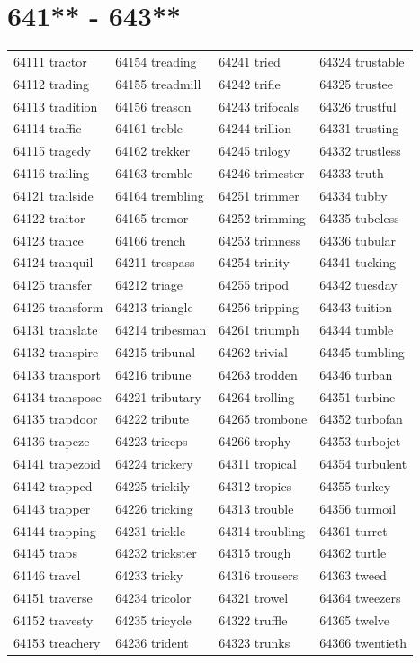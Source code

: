 \documentclass[10pt, oneside]{book}
\begin{document}
\begin{table}
	\centering
	\section*{641** - 643**}
	\begin{tabular}{l l l l}
64111 tractor &64154 treading &64241 tried &64324 trustable\\
64112 trading &64155 treadmill &64242 trifle &64325 trustee\\
64113 tradition &64156 treason &64243 trifocals &64326 trustful\\
64114 traffic &64161 treble &64244 trillion &64331 trusting\\
64115 tragedy &64162 trekker &64245 trilogy &64332 trustless\\
64116 trailing &64163 tremble &64246 trimester &64333 truth\\
64121 trailside &64164 trembling &64251 trimmer &64334 tubby\\
64122 traitor &64165 tremor &64252 trimming &64335 tubeless\\
64123 trance &64166 trench &64253 trimness &64336 tubular\\
64124 tranquil &64211 trespass &64254 trinity &64341 tucking\\
64125 transfer &64212 triage &64255 tripod &64342 tuesday\\
64126 transform &64213 triangle &64256 tripping &64343 tuition\\
64131 translate &64214 tribesman &64261 triumph &64344 tumble\\
64132 transpire &64215 tribunal &64262 trivial &64345 tumbling\\
64133 transport &64216 tribune &64263 trodden &64346 turban\\
64134 transpose &64221 tributary &64264 trolling &64351 turbine\\
64135 trapdoor &64222 tribute &64265 trombone &64352 turbofan\\
64136 trapeze &64223 triceps &64266 trophy &64353 turbojet\\
64141 trapezoid &64224 trickery &64311 tropical &64354 turbulent\\
64142 trapped &64225 trickily &64312 tropics &64355 turkey\\
64143 trapper &64226 tricking &64313 trouble &64356 turmoil\\
64144 trapping &64231 trickle &64314 troubling &64361 turret\\
64145 traps &64232 trickster &64315 trough &64362 turtle\\
64146 travel &64233 tricky &64316 trousers &64363 tweed\\
64151 traverse &64234 tricolor &64321 trowel &64364 tweezers\\
64152 travesty &64235 tricycle &64322 truffle &64365 twelve\\
64153 treachery &64236 trident &64323 trunks &64366 twentieth\\
	\end{tabular}
 \end{table}
\clearpage
\end{document}
